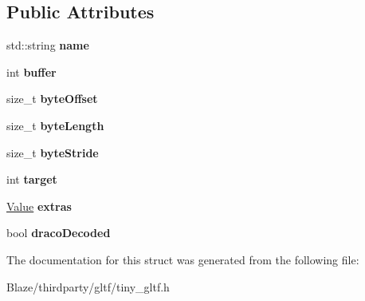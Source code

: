 \subsection*{Public Attributes}
\begin{DoxyCompactItemize}
\item 
\mbox{\label{structtinygltf_1_1BufferView_adcb1a2f8425e0083ee444b27becdf3fa}} 
std\+::string {\bfseries name}
\item 
\mbox{\label{structtinygltf_1_1BufferView_aae81d68ecebb5876493794d68cbdadce}} 
int {\bfseries buffer}
\item 
\mbox{\label{structtinygltf_1_1BufferView_a6a568135ca12bfd4745c58b035a6f4c9}} 
size\+\_\+t {\bfseries byte\+Offset}
\item 
\mbox{\label{structtinygltf_1_1BufferView_a40ef1de9330364690393aee2822bcfbe}} 
size\+\_\+t {\bfseries byte\+Length}
\item 
\mbox{\label{structtinygltf_1_1BufferView_ad42c65b61da5c0a2e6e7f7432c1408e6}} 
size\+\_\+t {\bfseries byte\+Stride}
\item 
\mbox{\label{structtinygltf_1_1BufferView_ab4a921ab66d3009b2e52535d1d0bc22f}} 
int {\bfseries target}
\item 
\mbox{\label{structtinygltf_1_1BufferView_a4f803718b9b29d0817e92764c7cefe60}} 
\hyperlink{classtinygltf_1_1Value}{Value} {\bfseries extras}
\item 
\mbox{\label{structtinygltf_1_1BufferView_afab2e8a1b5a27c4c591df74bbbe7e4f4}} 
bool {\bfseries draco\+Decoded}
\end{DoxyCompactItemize}


The documentation for this struct was generated from the following file\+:\begin{DoxyCompactItemize}
\item 
Blaze/thirdparty/gltf/tiny\+\_\+gltf.\+h\end{DoxyCompactItemize}
